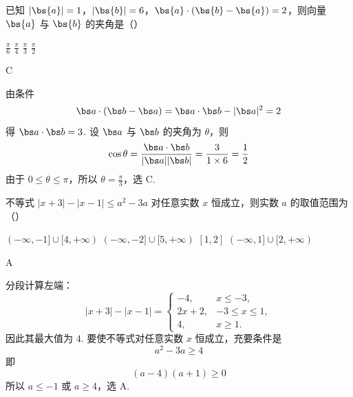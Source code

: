 \begin{problem}
已知 \(|\bs{a}| = 1\)，\(|\bs{b}| = 6\)，\(\bs{a} \cdot (\bs{b} - \bs{a}) = 2\)，则向量 \(\bs{a}\) 与 \(\bs{b}\) 的夹角是（\quad）

\choices
    {\(\frac{\pi}{6}\)}
    {\(\frac{\pi}{4}\)}
    {\(\frac{\pi}{3}\)}
    {\(\frac{\pi}{2}\)}

\begin{answer}
C
\end{answer}

\begin{solution}
由条件
\[
\bs a\cdot(\bs b-\bs a)=\bs a\cdot\bs b-|\bs a|^{2}=2
\]
得 \(\bs a\cdot\bs b=3\). 设 \(\bs a\) 与 \(\bs b\) 的夹角为 \(\theta\)，则
\[
\cos\theta=\frac{\bs a\cdot\bs b}{|\bs a||\bs b|}
=\frac{3}{1\times6}=\frac12
\]
由于 \(0\leqslant\theta\leqslant\pi\)，所以 \(\theta=\frac{\pi}{3}\)，选 C.
\end{solution}
\end{problem}

\begin{problem}
不等式 \( |x + 3| - |x - 1| \leqslant a^{2} - 3a \) 对任意实数 \(x\) 恒成立，则实数 \(a\) 的取值范围为（\quad）

\choices
    {\((-\infty, -1] \cup [4, +\infty)\)}
    {\((-\infty, -2] \cup [5, +\infty)\)}
    {\([1,2]\)}
    {\((-\infty, 1] \cup [2, +\infty)\)}

\begin{answer}
A
\end{answer}

\begin{solution}
分段计算左端：
\[
|x+3|-|x-1|=
\begin{cases}
-4,&x\leqslant-3,\\
2x+2,&-3\leqslant x\leqslant1,\\
4,&x\geqslant1.
\end{cases}
\]
因此其最大值为 \(4\). 要使不等式对任意实数 \(x\) 恒成立，充要条件是
\[
a^{2}-3a\geqslant4
\]
即
\[
(a-4)(a+1)\geqslant0
\]
所以 \(a\leqslant-1\) 或 \(a\geqslant4\)，选 A.
\end{solution}
\end{problem}

